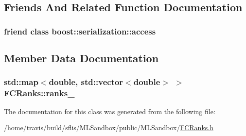 \subsection{Friends And Related Function Documentation}
\hypertarget{classFCRanks_ac98d07dd8f7b70e16ccb9a01abf56b9c}{
\subsubsection[{boost\-::serialization\-::access}]{\setlength{\rightskip}{0pt plus 5cm}friend class boost\-::serialization\-::access\hspace{0.3cm}{\ttfamily [friend]}}}\label{classFCRanks_ac98d07dd8f7b70e16ccb9a01abf56b9c}


\subsection{Member Data Documentation}
\hypertarget{classFCRanks_a97d239b8b91d740673a25ebd90443337}{
\subsubsection[{ranks\-\_\-}]{\setlength{\rightskip}{0pt plus 5cm}std\-::map$<$double, std\-::vector$<$double$>$ $>$ F\-C\-Ranks\-::ranks\-\_\-}}\label{classFCRanks_a97d239b8b91d740673a25ebd90443337}


The documentation for this class was generated from the following file\-:\begin{DoxyCompactItemize}
\item 
/home/travis/build/sflis/\-M\-L\-Sandbox/public/\-M\-L\-Sandbox/\hyperlink{FCRanks_8h}{F\-C\-Ranks.\-h}\end{DoxyCompactItemize}
